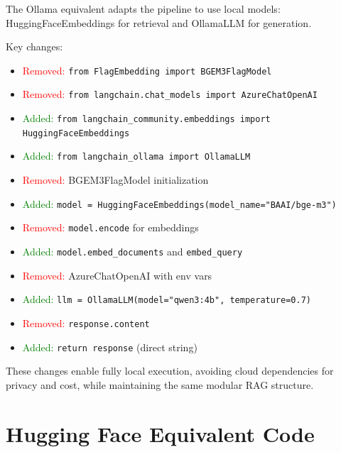 \documentclass[11pt, a4paper]{article}
\begin{document}
The Ollama equivalent adapts the pipeline to use local models: HuggingFaceEmbeddings for retrieval and OllamaLLM for generation.

Key changes:
\begin{itemize}
    \item \textcolor{red}{Removed:} \texttt{from FlagEmbedding import BGEM3FlagModel}
    \item \textcolor{red}{Removed:} \texttt{from langchain.chat\_models import AzureChatOpenAI}
    \item \textcolor{green}{Added:} \texttt{from langchain\_community.embeddings import HuggingFaceEmbeddings}
    \item \textcolor{green}{Added:} \texttt{from langchain\_ollama import OllamaLLM}
    \item \textcolor{red}{Removed:} BGEM3FlagModel initialization
    \item \textcolor{green}{Added:} \texttt{model = HuggingFaceEmbeddings(model\_name="BAAI/bge-m3")}
    \item \textcolor{red}{Removed:} \texttt{model.encode} for embeddings
    \item \textcolor{green}{Added:} \texttt{model.embed\_documents} and \texttt{embed\_query}
    \item \textcolor{red}{Removed:} AzureChatOpenAI with env vars
    \item \textcolor{green}{Added:} \texttt{llm = OllamaLLM(model="qwen3:4b", temperature=0.7)}
    \item \textcolor{red}{Removed:} \texttt{response.content}
    \item \textcolor{green}{Added:} \texttt{return response} (direct string)
\end{itemize}

These changes enable fully local execution, avoiding cloud dependencies for privacy and cost, while maintaining the same modular RAG structure.

\section{Hugging Face Equivalent Code}
\end{document}
